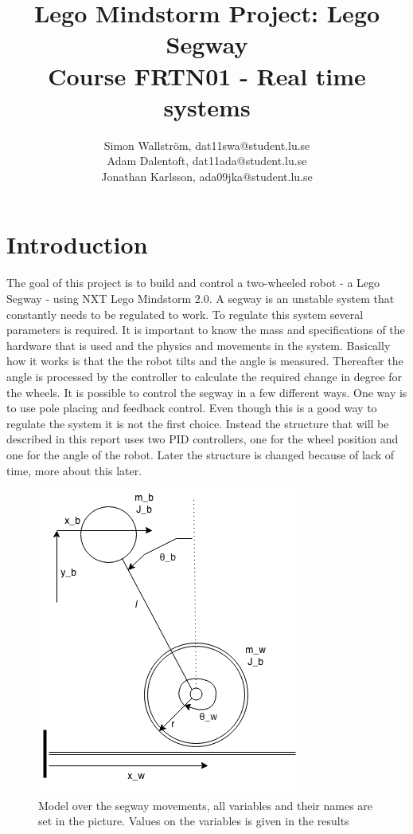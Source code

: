 \documentclass[a4paper]{article}
\title{Lego Mindstorm Project: Lego Segway\\
Course FRTN01 - Real time systems}
\author{Simon Wallström, dat11swa@student.lu.se\\
Adam Dalentoft, dat11ada@student.lu.se\\
Jonathan Karlsson, ada09jka@student.lu.se}
\begin{document}

\maketitle
\thispagestyle{empty}
\newpage
\setcounter{page}{1}
\tableofcontents
\newpage
\section{Introduction}
The goal of this project is to build and control a two-wheeled robot - a Lego Segway - using NXT Lego Mindstorm 2.0. A segway is an unstable system that constantly needs to be regulated to work. To regulate this system several parameters is required. It is important to know the mass and specifications of the hardware that is used and the physics and movements in the system. Basically how it works is that the the robot tilts and the angle is measured. Thereafter the angle is processed by the controller to calculate the required change in degree for the wheels. It is possible to control the segway in a few different ways. One way is to use pole placing and feedback control. Even though this is a good way to regulate the system it is not the first choice. Instead the structure that will be described in this report uses two PID controllers, one for the wheel position and one for the angle of the robot. Later the structure is changed because of lack of time, more about this later.\\

\begin{figure}[H]
  \centering
\includegraphics[scale=0.8]{pic/segway.png}
\caption{Model over the segway movements, all variables and their names are set in the picture. Values on the variables is given in the results }
\end{figure}
\end{document}
